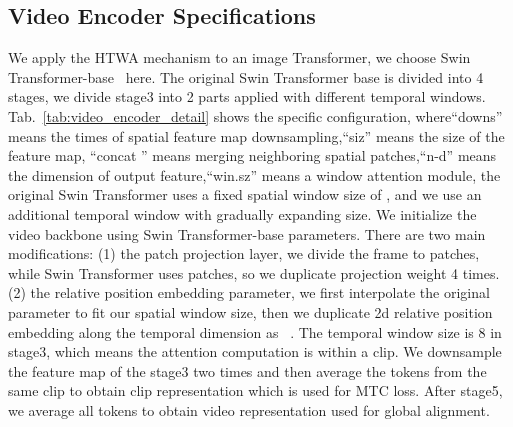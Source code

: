 \documentclass{article}
\begin{document}
\subsection{Video Encoder Specifications}
We apply the HTWA mechanism to an image Transformer, we choose Swin Transformer-base~\cite{liu2021swin} here. The original Swin Transformer base is divided into 4 stages, we divide stage3 into 2 parts applied with different temporal windows. Tab.~\ref{tab:video_encoder_detail} shows the specific configuration, where``downs'' means the times of spatial feature map downsampling,``siz'' means the size of the feature map, ``concat '' means merging  neighboring spatial patches,``n-d'' means the dimension of output feature,``win.sz'' means a window attention module, the original Swin Transformer uses a fixed spatial window size of , and we use an additional temporal window with gradually expanding size.
We initialize the video backbone using Swin Transformer-base parameters. There are two main modifications: (1) the patch projection layer, we divide the frame to  patches, while Swin Transformer uses  patches, so we duplicate projection weight 4 times. (2) the relative position embedding parameter, we first interpolate the original parameter to fit our spatial window size, then we duplicate 2d relative position embedding along the temporal dimension as ~\cite{liu2021videoswin}.
The temporal window size is 8 in stage3, which means the attention computation is within a clip. We downsample the feature map of the stage3 two times and then average the tokens from the same clip to obtain clip representation which is used for MTC loss. After stage5, we average all tokens to obtain video representation used for global alignment.
\end{document}
